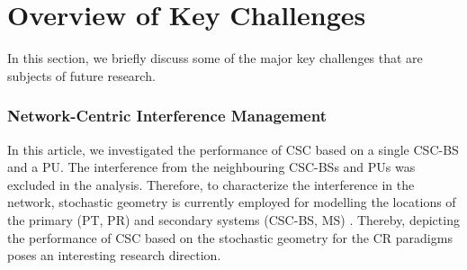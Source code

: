 \documentclass[draftcls, onecolumn, 11pt]{IEEEtran}
\newcommand{\sub}[1]{_{\text{#1}}}
\newcommand{\hpt}{h\sub{p,2}}
\newcommand{\hs}{h\sub{s}}
\begin{document}
\section{Overview of Key Challenges}\label{sec:r_cha} 

In this section, we briefly discuss some of the major key challenges that are subjects of future research. %
\subsubsection*{Network-Centric Interference Management}
In this article, we investigated the performance of CSC based on a single CSC-BS and a PU. The interference from the neighbouring CSC-BSs and PUs was excluded in the analysis. Therefore, to characterize the interference in the network, stochastic geometry is currently employed for modelling the locations of the primary (PT, PR) and secondary systems (CSC-BS, MS) \cite{Elsawy13}. Thereby, depicting the performance of CSC based on the stochastic geometry for the CR paradigms poses an interesting research direction. 


\end{document}

